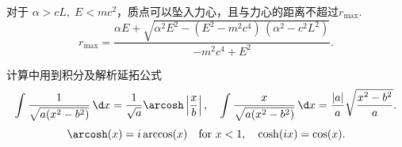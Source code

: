 对于 \(\alpha > cL,\; E < mc^2\)，质点可以坠入力心，且与力心的距离不超过\(r_{\max}\).
\begin{equation*}
	r_{\max} =
	\frac{
		\alpha E +
		\sqrt{
			\alpha^2 E^2 - (E^2 - m^2 c^4)\,(\alpha^2 - c^2 L^2)
		}
	}{
		-m^2 c^4 + E^2
	}.
\end{equation*}

计算中用到积分及解析延拓公式
\begin{equation*}
	\int \dfrac{1}{\sqrt{a (x^2 - b^2)}} \, \d x = \dfrac{1}{\sqrt{a}} \arcosh \left| \dfrac{x}{b} \right|,\quad   \int \dfrac{x}{\sqrt{a (x^2 - b^2)}} \, \d x = \dfrac{|a|}{a} \sqrt{\dfrac{x^2 - b^2}{a}}.
\end{equation*}
\begin{equation*}
	\arcosh(x) = i \arccos(x)\quad \text{for}\,\, x < 1,\quad
	\cosh(i x) = \cos(x).
\end{equation*}

